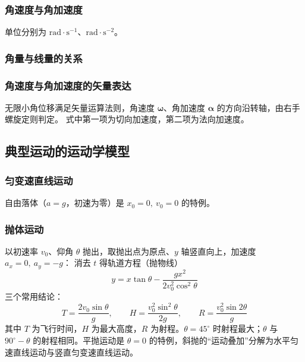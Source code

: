         \subsubsection{角速度与角加速度}
        单位分别为 $\mathrm{rad\cdot s^{-1}}$、$\mathrm{rad\cdot s^{-2}}$。

        \subsubsection{角量与线量的关系}

        \subsubsection{角速度与角加速度的矢量表达}
        无限小角位移满足矢量运算法则，角速度 $\boldsymbol{\omega}$、角加速度 $\boldsymbol{\alpha}$ 的方向沿转轴，由右手螺旋定则判定。
        式中第一项为切向加速度，第二项为法向加速度。

    \subsection{典型运动的运动学模型}
        \subsubsection{匀变速直线运动}
        自由落体（$a=g$，初速为零）是 $x_{0}=0,\ v_{0}=0$ 的特例。

        \subsubsection{抛体运动}
        以初速率 $v_{0}$、仰角 $\theta$ 抛出，取抛出点为原点、$y$ 轴竖直向上，加速度 $a_{x}=0,\ a_{y}=-g$：
        消去 $t$ 得轨道方程（抛物线）
        \[
        y=x\tan\theta-\frac{gx^{2}}{2v_{0}^{2}\cos^{2}\theta}
        \]
        三个常用结论：
        \[
        T=\frac{2v_{0}\sin\theta}{g},\qquad
        H=\frac{v_{0}^{2}\sin^{2}\theta}{2g},\qquad
        R=\frac{v_{0}^{2}\sin2\theta}{g}
        \]
        其中 $T$ 为飞行时间，$H$ 为最大高度，$R$ 为射程。$\theta=45^{\circ}$ 时射程最大；$\theta$ 与 $90^{\circ}-\theta$ 的射程相同。平抛运动是 $\theta=0$ 的特例，斜抛的“运动叠加”分解为水平匀速直线运动与竖直匀变速直线运动。

